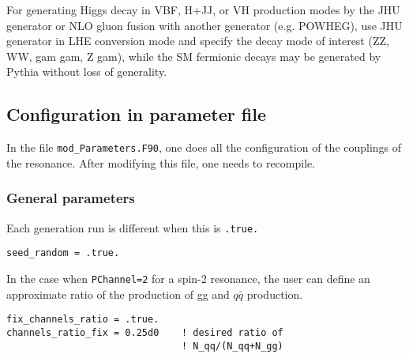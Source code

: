 \documentclass[aps,superscriptaddress,nofootinbib]{revtex4}
\begin{document}

\noindent
For generating Higgs decay in VBF, H+JJ, or VH production
modes by the JHU generator or NLO gluon fusion with another generator (e.g. POWHEG), use JHU generator in LHE 
conversion mode and specify the decay mode of interest (ZZ, WW, gam gam, Z gam), while the SM fermionic decays 
may be generated by Pythia without loss of generality.

\subsection{ Configuration in parameter file  }

In the file \verb|mod_Parameters.F90|, one does all the configuration of the couplings of the resonance.
After modifying this file, one needs to recompile. 

\subsubsection{ General parameters }

\noindent
Each generation run is different when this is \verb|.true.| 

\begin{verbatim}
seed_random = .true.
\end{verbatim}

\noindent
In the case when \verb|PChannel=2| for a spin-2 resonance, the user can define an approximate ratio of the production of gg and $q\bar{q}$ production.

\begin{verbatim}
fix_channels_ratio = .true.
channels_ratio_fix = 0.25d0    ! desired ratio of
                               ! N_qq/(N_qq+N_gg)
\end{verbatim}
\end{document}

